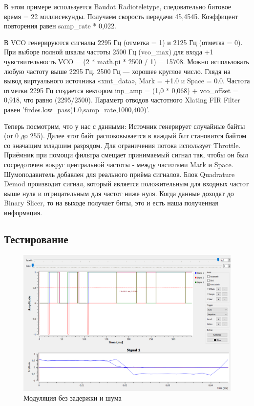 В этом примере используется Baudot Radioteletype, следовательно битовое время = 22 миллисекунды. Получаем скорость передачи 45,4545.
Коэффицент повторения равен samp\_rate * 0,022.

В VCO генерируются сигналы 2295 Гц (отметка = 1) и 2125 Гц (отметка = 0). При выборе полной шкалы частоты 2500 Гц (vco\_max) для входа +1 чувствительность VCO = (2 * math.pi * 2500 / 1) = 15708. Можно использовать любую частоту выше 2295 Гц. 2500 Гц — хорошее круглое число. Глядя на вывод виртуального источника «xmt\_data», Mark = +1.0 и Space = 0.0. Частота отметки 2295 Гц создается вектором inp\_amp = (1,0 * 0,068) + vco\_offset = 0,918, что равно (2295/2500). Параметр отводов частотного Xlating FIR Filter равен 'firdes.low\_pass(1.0,samp\_rate,1000,400)'.

Теперь посмотрим, что у нас с данными:
\quad Источник генерирует случайные байты (от 0 до 255). Далее этот байт распоковывается в каждый бит становится байтом со значащим младшим разрядом. Для ограничения потока использует Throttle.
\quad Приёмник при помощи фильтра смещает принимаемый сигнал так, чтобы он был сосредоточен вокруг центральной частоты - между частотами Mark и Space. Шумоподавитель добавлен для реального приёма сигналов. Блок Quadrature Demod производит сигнал, который является положительным для входных частот выше нуля и отрицательным для частот ниже нуля. Когда данные доходят до Binary Slicer, то на выходе получает биты, это и есть наша полученная информация.


\subsection{Тестирование}

    \begin{figure}[H]
	\begin{center}
		\includegraphics[scale=0.4]{fig/lab12/lab12_2.png}
		\caption{Модуляция без задержки и шума}
		\label{pic:e1} %
	\end{center}
\end{figure}

